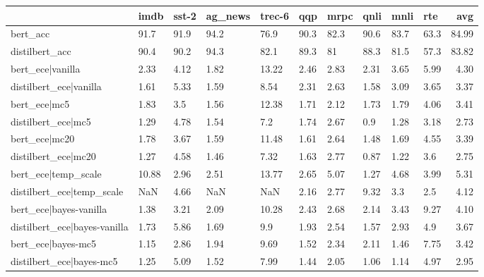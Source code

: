 \begin{tabular}{llllllllllr}
\toprule
{} &   imdb & sst-2 & ag\_news & trec-6 &   qqp &  mrpc &  qnli &  mnli &   rte &    avg \\
\midrule
bert\_acc                     &   91.7 &  91.9 &    94.2 &   76.9 &  90.3 &  82.3 &  90.6 &  83.7 &  63.3 &  84.99 \\
distilbert\_acc               &   90.4 &  90.2 &    94.3 &   82.1 &  89.3 &    81 &  88.3 &  81.5 &  57.3 &  83.82 \\
bert\_ece|vanilla             &   2.33 &  4.12 &    1.82 &  13.22 &  2.46 &  2.83 &  2.31 &  3.65 &  5.99 &   4.30 \\
distilbert\_ece|vanilla       &   1.61 &  5.33 &    1.59 &   8.54 &  2.31 &  2.63 &  1.58 &  3.09 &  3.65 &   3.37 \\
bert\_ece|mc5                 &   1.83 &   3.5 &    1.56 &  12.38 &  1.71 &  2.12 &  1.73 &  1.79 &  4.06 &   3.41 \\
distilbert\_ece|mc5           &   1.29 &  4.78 &    1.54 &    7.2 &  1.74 &  2.67 &   0.9 &  1.28 &  3.18 &   2.73 \\
bert\_ece|mc20                &   1.78 &  3.67 &    1.59 &  11.48 &  1.61 &  2.64 &  1.48 &  1.69 &  4.55 &   3.39 \\
distilbert\_ece|mc20          &   1.27 &  4.58 &    1.46 &   7.32 &  1.63 &  2.77 &  0.87 &  1.22 &   3.6 &   2.75 \\
bert\_ece|temp\_scale          &  10.88 &  2.96 &    2.51 &  13.77 &  2.65 &  5.07 &  1.27 &  4.68 &  3.99 &   5.31 \\
distilbert\_ece|temp\_scale    &    NaN &  4.66 &     NaN &    NaN &  2.16 &  2.77 &  9.32 &   3.3 &   2.5 &   4.12 \\
bert\_ece|bayes-vanilla       &   1.38 &  3.21 &    2.09 &  10.28 &  2.43 &  2.68 &  2.14 &  3.43 &  9.27 &   4.10 \\
distilbert\_ece|bayes-vanilla &   1.73 &  5.86 &    1.69 &    9.9 &  1.93 &  2.54 &  1.57 &  2.93 &   4.9 &   3.67 \\
bert\_ece|bayes-mc5           &   1.15 &  2.86 &    1.94 &   9.69 &  1.52 &  2.34 &  2.11 &  1.46 &  7.75 &   3.42 \\
distilbert\_ece|bayes-mc5     &   1.25 &  5.09 &    1.52 &   7.99 &  1.44 &  2.05 &  1.06 &  1.14 &  4.97 &   2.95 \\
\bottomrule
\end{tabular}
